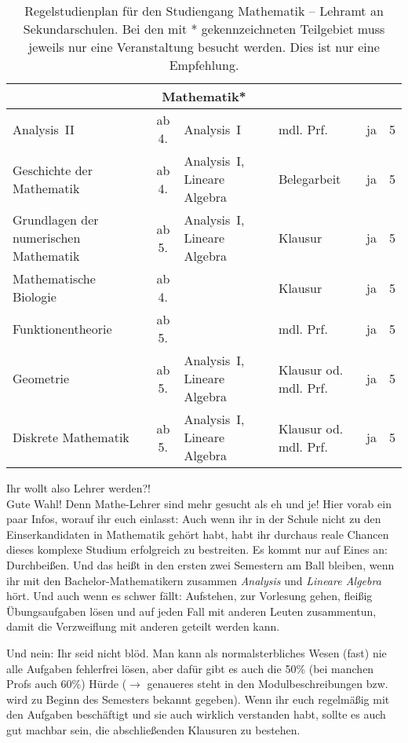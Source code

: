 \begin{table}[tbp]
\begin{small}
\begin{tabularx}{\textwidth}{|@{~}X@{~}|@{~}c@{~}|@{~}X@{~}|@{~}X@{~}|@{~}c@{~}|@{~}c@{~}|}
			\multicolumn{6}{|c|}{Mathematik*}\\\hline
			Analysis~II & ab 4. & Analysis~I & mdl. Prf. & ja & 5\\\hline
			Geschichte der Mathematik & ab 4. & Analysis~I, Lineare Algebra & Belegarbeit & ja & 5\\\hline
			Grundlagen der numerischen Mathematik & ab 5. & Analysis~I, Lineare Algebra & Klausur & ja & 5\\\hline
			Mathematische Biologie & ab 4. & & Klausur & ja & 5\\\hline
			Funktionentheorie & ab 5. & & mdl. Prf. & ja & 5\\\hline
			Geometrie & ab 5. & Analysis~I, Lineare Algebra & Klausur od. mdl. Prf.& ja & 5\\\hline
			Diskrete Mathematik & ab 5. & Analysis~I, Lineare Algebra & Klausur od. mdl. Prf.& ja & 5\\\hline
		\end{tabularx}
	\end{small}
	\caption{\label{plan-las}Regelstudienplan für den Studiengang Mathematik -- Lehramt an Sekundarschulen. Bei den mit * gekennzeichneten Teilgebiet muss jeweils nur eine Veranstaltung besucht werden. Dies ist nur eine Empfehlung.}
\end{table}

Ihr wollt also Lehrer werden?!\\
Gute Wahl! Denn Mathe-Lehrer sind mehr gesucht als eh und je! 
Hier vorab ein paar Infos, worauf ihr euch einlasst: Auch wenn ihr in der Schule nicht zu den Einserkandidaten in Mathematik gehört habt, habt ihr durchaus reale Chancen dieses komplexe Studium erfolgreich zu bestreiten.
Es kommt nur auf Eines an: Durchbeißen.
Und das heißt in den ersten zwei Semestern am Ball bleiben, wenn ihr mit den Bachelor-Mathematikern zusammen \textit{Analysis} und \textit{Lineare Algebra} hört.
Und auch wenn es schwer fällt:
Aufstehen, zur Vorlesung gehen, fleißig Übungsaufgaben lösen und auf jeden Fall mit anderen Leuten zusammentun, damit die Verzweiflung mit anderen geteilt werden kann.

Und nein: Ihr seid nicht blöd.
Man kann als normalsterbliches Wesen (fast) nie alle Aufgaben fehlerfrei lösen, aber dafür gibt es auch die 50\% (bei manchen Profs auch 60\%) Hürde ($\rightarrow$  genaueres steht in den Modulbeschreibungen bzw. wird zu Beginn des Semesters bekannt gegeben).
Wenn ihr euch regelmäßig mit den Aufgaben beschäftigt und sie auch wirklich verstanden habt, sollte es auch gut machbar sein, die abschließenden Klausuren zu bestehen.

